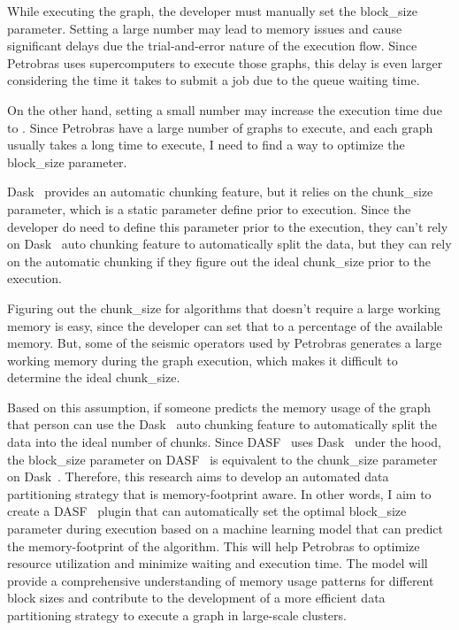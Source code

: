 While executing the graph, the developer must manually set the block\_size parameter.
Setting a large number may lead to memory issues and cause significant delays due the trial-and-error nature of the execution flow.
Since Petrobras uses supercomputers to execute those graphs, this delay is even larger considering the time it takes to submit a job due to the queue waiting time.

On the other hand, setting a small number may increase the execution time due to .
Since Petrobras have a large number of graphs to execute, and each graph usually takes a long time to execute, I need to find a way to optimize the block\_size parameter.

Dask~\cite{dask} provides an automatic chunking feature, but it relies on the chunk\_size parameter, which is a static parameter define prior to execution.
Since the developer do need to define this parameter prior to the execution, they can't rely on Dask~\cite{dask} auto chunking feature to automatically split the data, but they can rely on the automatic chunking if they figure out the ideal chunk\_size prior to the execution.

Figuring out the chunk\_size for algorithms that doesn't require a large working memory is easy, since the developer can set that to a percentage of the available memory.
But, some of the seismic operators used by Petrobras generates a large working memory during the graph execution, which makes it difficult to determine the ideal chunk\_size.

Based on this assumption, if someone predicts the memory usage of the graph that person can use the Dask~\cite{dask} auto chunking feature to automatically split the data into the ideal number of chunks.
Since \ac{DASF}~\cite{dasf} uses Dask~\cite{dask} under the hood, the block\_size parameter on \ac{DASF}~\cite{dasf} is equivalent to the chunk\_size parameter on Dask~\cite{dask}.
Therefore, this research aims to develop an automated data partitioning strategy that is memory-footprint aware.
In other words, I aim to create a \ac{DASF}~\cite{dasf} plugin that can automatically set the optimal block\_size parameter during execution based on a machine learning model that can predict the memory-footprint of the algorithm.
This will help Petrobras to optimize resource utilization and minimize waiting and execution time.
The model will provide a comprehensive understanding of memory usage patterns for different block sizes and contribute to the development of a more efficient data partitioning strategy to execute a graph in large-scale clusters.
